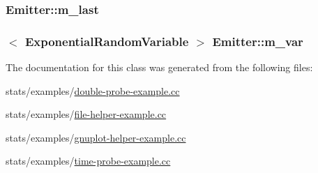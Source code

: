 \subsubsection[{\texorpdfstring{m\+\_\+last}{m_last}}]{ Emitter\+::m\+\_\+last\hspace{0.3cm}{\ttfamily [private]}}\hypertarget{classEmitter_a8fe682033b84c0cea6929f0b3a23fef3}{}\label{classEmitter_a8fe682033b84c0cea6929f0b3a23fef3}
\subsubsection[{\texorpdfstring{m\+\_\+var}{m_var}}]{$<$ {\bf Exponential\+Random\+Variable} $>$ Emitter\+::m\+\_\+var\hspace{0.3cm}{\ttfamily [private]}}\hypertarget{classEmitter_aeb07b47ae29eeb2a3fd2307546f46593}{}\label{classEmitter_aeb07b47ae29eeb2a3fd2307546f46593}


The documentation for this class was generated from the following files\+:\begin{DoxyCompactItemize}
\item 
stats/examples/\hyperlink{double-probe-example_8cc}{double-\/probe-\/example.\+cc}\item 
stats/examples/\hyperlink{file-helper-example_8cc}{file-\/helper-\/example.\+cc}\item 
stats/examples/\hyperlink{gnuplot-helper-example_8cc}{gnuplot-\/helper-\/example.\+cc}\item 
stats/examples/\hyperlink{time-probe-example_8cc}{time-\/probe-\/example.\+cc}\end{DoxyCompactItemize}
